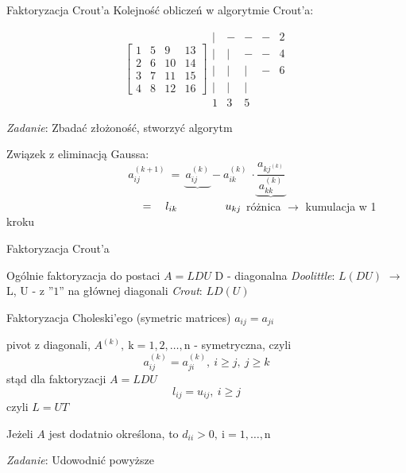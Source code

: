 \begin{frame}{ Faktoryzacja Crout'a}
Kolejność obliczeń w algorytmie Crout'a:

$$
\begin{bmatrix}
1 & 5 & 9 & 13\\
2 & 6 & 10 & 14\\
3 & 7 & 11 & 15\\
4 & 8 & 12 & 16
\end{bmatrix}
\begin{array}{lllll}
| & - & - &- & 2 \\
| & | & - & - & 4 \\
| & | & | & - & 6 \\
| & | & | \\
1 & 3 & 5 
\end{array}
$$
\begin{flushright}

{\it Zadanie}: Zbadać złożoność, stworzyć algorytm
\end{flushright}
Związek z eliminacją Gaussa:
$$
a_{ij}^{(k+1)}\ =\ \underbrace{a_{ij}^{(k)}} -a_{ik}^{(k)}\ \cdot \underbrace{\frac{a_{kj^{(k)}}}{a_{kk}^{(k)}}}
$$
$ \hspace{43mm} =\ \ \  l_{ik}\ \ \ \ \ \ \ \ \ \ \ \ \ u_{kj}
$
\newline \hspace*{30mm} różnica $\rightarrow$ kumulacja w 1 kroku

\end{frame}
\begin{frame}{ Faktoryzacja Crout'a}
\begin{exampleblock}{Ogólnie faktoryzacja do postaci $A=LDU$}
D - diagonalna \hspace{40mm } {\it Doolittle}: \hspace{10mm} $L(DU)$ \newline
\hspace*{55mm} $\rightarrow$ 
\newline
 L, U - z ''$1$'' na głównej diagonali \hspace{15mm} {\it Crout}: \hspace{11mm}  $LD(U)$
\newline 
\end{exampleblock}
\end{frame}
\begin{frame}{Faktoryzacja Choleski'ego}
(symetric matrices) $a_{ij}=a_{ji}$

pivot z diagonali, $A^{(k)}, \ \mathrm{k}=1,2,\ldots,\mathrm{n}$ - symetryczna, czyli
$$
a_{ij}^{(k)}=a_{ji}^{(k)},\ i\geq j,\ j\geq k
$$
stąd dla faktoryzacji $A=LDU$
$$
l_{ij}=u_{ij},\ i\geq j
$$
czyli $L=UT$

Jeżeli $A$ jest dodatnio określona, to $d_{ii}>0, \ \mathrm{i}=1,\ldots,\mathrm{n}$
\begin{flushright}
{\it Zadanie}: Udowodnić powyższe 
\end{flushright}

\end{frame}
